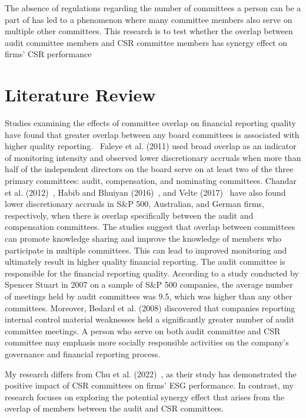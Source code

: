 \documentclass{article}
\begin{document}
The absence of regulations regarding the number of committees a person can be a part of has led to a phenomenon where many committee members also serve on multiple other committees. This research is to test whether the overlap between audit committee members and CSR committee members has synergy effect on firms' CSR performance

\section{Literature Review}
Studies examining the effects of committee overlap on financial reporting quality have found that greater overlap between any board committees is associated with higher quality reporting. ~\cite{faleye2011costs}Faleye et al. (2011) used broad overlap as an indicator of monitoring intensity and observed lower discretionary accruals when more than half of the independent directors on the board serve on at least two of the three primary committees: audit, compensation, and nominating committees. Chandar et al. (2012)~\cite{chandar2012does}, Habib and Bhuiyan (2016)~\cite{habib2016overlapping}, and Velte (2017)~\cite{velte2017overlapping} have also found lower discretionary accruals in S&P 500, Australian, and German firms, respectively, when there is overlap specifically between the audit and compensation committees. The studies suggest that overlap between committees can promote knowledge sharing and improve the knowledge of members who participate in multiple committees. This can lead to improved monitoring and ultimately result in higher quality financial reporting. The audit committee is responsible for the financial reporting quality. According to a study conducted by Spencer Stuart in 2007 on a sample of S&P 500 companies, the average number of meetings held by audit committees was 9.5, which was higher than any other committees. Moreover, Bedard et al. (2008) discovered that companies reporting internal control material weaknesses held a significantly greater number of audit committee meetings. A person who serve on both audit committee and CSR committee may emphasis more socially responsible activities on the company’s governance and financial reporting process.

My research differs from Chu et al. (2022)~\cite{chu2022corporate}, as their study has demonstrated the positive impact of CSR committees on firms' ESG performance. In contrast, my research focuses on exploring the potential synergy effect that arises from the overlap of members between the audit and CSR committees.
\end{document}

